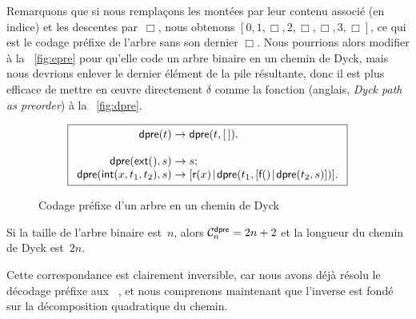 Remarquons que si nous remplaçons les montées par leur contenu associé
(en indice) et les descentes par~\(\Box\), nous obtenons \([0, 1,
\Box, 2, \Box, \Box, 3, \Box]\), ce qui est le codage
préfixe de l'arbre sans
son dernier \(\Box\). Nous pourrions alors modifier
 à la \fig~\vref{fig:epre} pour
qu'elle code un arbre binaire en un chemin de Dyck, mais nous devrions enlever le dernier élément de la pile
résultante, donc il est plus efficace de mettre en {\oe}uvre
directement \(\delta\) comme la fonction
 (anglais, \emph{Dyck path as
  preorder}) à la \fig~\vref{fig:dpre}.
\begin{figure}
\begin{equation*}
\boxed{
\begin{array}{r@{\;}c@{\;}l}
\fun{dpre}(t) & \rightarrow & \fun{dpre}(t,\el).\\
\\
\fun{dpre}(\fun{ext}(),s) & \rightarrow & s;\\
\fun{dpre}(\fun{int}(x,t_1,t_2),s)
  & \rightarrow
  & \cons{\fun{r}(x)}{\fun{dpre}(t_1,\cons{\fun{f}()}{\fun{dpre}(t_2,s)})}.
\end{array}}
\end{equation*}
\caption{Codage préfixe d'un arbre en un chemin de Dyck\label{fig:dpre}}
\end{figure}
Si la taille de l'arbre binaire est~\(n\), alors \(\C{\fun{dpre}}{n} =
2n+2\) et la longueur du chemin de
Dyck est~\(2n\).

Cette correspondance est clairement inversible, car nous avons déjà
résolu le décodage préfixe aux
\figs~,
 et nous comprenons maintenant que
l'inverse est fondé sur la décomposition quadratique du
chemin.

